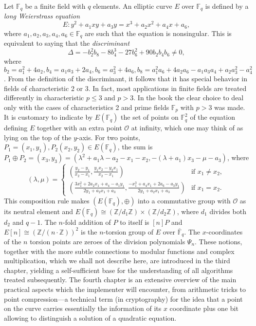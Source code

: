 \documentclass[final]{mcom-l}
\begin{document}
Let $\mathbb{F}_q$ be a finite field with $q$ elements.  An elliptic curve $E$
over $\mathbb{F}_q$ is defined by a \emph{long Weierstrass equation}
\[E:y^2+a_1xy+a_3y=x^3+a_2x^2+a_4x+a_6,\]
where $a_1,a_2,a_3,a_4,a_6\in \mathbb{F}_q$ are such that the equation is
nonsingular.  This is equivalent to saying that the \emph{discriminant}
\[\Delta=-b^2_2b_8-8b^3_4-27b^2_6+90b_2b_4b_6\ne 0,\]
where $b_2=a^2_1+4a_2, b_4=a_1a_3+2a_4, b_6=a^2_3+4a_6,b_8=a^2_1a_6+4a_2a_6-
a_1a_3a_4+a_2a^2_3-a^2_4$.  From the definition of the discriminant, it follows
that it has special behavior in fields of characteristic 2 or 3.  In fact, most
applications in finite fields are treated differently in characteristic $p\le
3$ and $p>3$.  In the book the clear choice to deal only with the cases of
characteristics 2 and prime fields $\mathbb{F}_p$ with $p>3$ was made.  It is
customary to indicate by $E(\mathbb{F}_q)$ the set of points on $\mathbb{F}^2_q$
of the equation defining $E$ together with an extra point $\mathcal{O}$ at
infinity, which one may think of as lying on the top of the $y$-axis.  For two
points, $P_1=(x_1,y_1), P_2(x_2,y_2)\in E(\mathbb{F}_q)$, the sum is $P_1\oplus
P_2=(x_3,y_3)=(\lambda^2+a_1\lambda-a_2-x_1-x_2,-(\lambda+a_1)x_3-\mu-a_3)$,
where
\[(\lambda,\mu)=\begin{cases}
\left(\frac {y_2-y_1}{x_2-x_1}, \frac{y_1x_2-y_2x_1}{x_2-x_1}\right)
&\text{if } x_1\ne x_2,\\
\left(\frac{3x^2_1+2a_2x_1+a_4-a_1y_1} {2y_1+a_2x_1+a_3},
\frac{-x^3_1+a_4x_1+2a_6-a_3y_1}{2y_1+a_2x_1+a_3}\right) &\text{if }x_1=x_2.
\end{cases}\]
This composition rule makes $(E(\mathbb{F}_q),\oplus)$ into a commutative group
with $\mathcal{O}$ as its neutral element and $E(\mathbb{F}_q)\cong
(\mathbb{Z}/d_1\mathbb{Z})\times (\mathbb{Z}/d_2\mathbb{Z})$, where $d_1$
divides both $d_2$ and $q-1$.  The $n$-fold addition of $P$ to itself is $[n]P$
and $E[n]\cong (\mathbb{Z}/(n\cdot \mathbb{Z}))^2$ is the $n$-torsion group of
$E$ over $\overline{\mathbb{F}}_q$.  The $x$-coordinates of the $n$ torsion
points are zeroes of the division polynomials $\Psi_n$.  These notions,
together with the more subtle connections to modular functions and complex
multiplication, which we shall not describe here, are introduced in the third
chapter, yielding a self-sufficient base for the understanding of all
algorithms treated subsequently.  The fourth chapter is an extensive overview
of the main practical aspects which the implementer will encounter, from
arithmetic tricks to point compression---a technical term (in cryptography) for
the idea that a point on the curve carries essentially the information of its
$x$ coordinate plus one bit allowing to distinguish a solution of a quadratic
equation.
\end{document}
